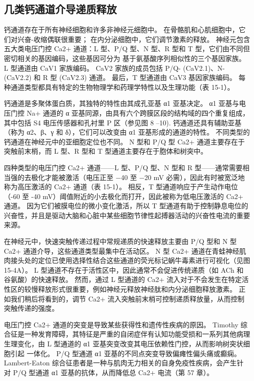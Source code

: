 \subsection{几类钙通道介导递质释放}

钙通道存在于所有神经细胞和许多非神经元细胞中。 在骨骼肌和心肌细胞中，它们对兴奋-收缩偶联很重要； 在内分泌细胞中，它们调节激素的释放。 神经元包含五大类电压门控 Ca2+ 通道：L 型、P/Q 型、N 型、R 型和 T 型，它们由不同但密切相关的基因编码，这些基因可分为 基于氨基酸序列相似性的三个基因家族。 L 型通道由 CaV1 家族编码。 CaV2 家族的成员包括 P/Q- (CaV2.1)、N- (CaV2.2) 和 R 型 (CaV2.3) 通道。 最后，T 型通道由 CaV3 基因家族编码。 每种通道类型都具有特定的生物物理学和药理学特性以及生理功能（表 15-1）。

钙通道是多聚体蛋白质，其独特的特性由其成孔亚基 α1 亚基决定。 α1 亚基与电压门控 Na+ 通道的 α 亚基同源，由具有六个跨膜区段的结构域的四个重复组成，其中包括 S4 电压传感器和孔衬里 P 区（参见图 8 –10). 钙通道还具有辅助亚基（称为 α2、β、γ 和 δ），它们可以改变由 α1 亚基形成的通道的特性。 不同类型的钙通道在神经元中的亚细胞定位也不同。 N 型和 P/Q 型 Ca2+ 通道主要存在于突触前末梢，而 L 型、R 型和 T 型通道主要存在于胞体和树突中。

四种类型的电压门控 Ca2+ 通道——L 型、P/Q 型、N 型和 R 型——通常需要相当强的去极化才能被激活（电压正至 −40 至 −20 mV 必需），因此有时被宽泛地称为高压激活的 Ca2+ 通道（表 15-1）。 相反，T 型通道响应于产生动作电位（-60 至 -40 mV）阈值附近的小去极化而打开，因此被称为低电压激活的 Ca2+ 通道。 因为它们被膜电位的微小变化激活，所以 T 型通道有助于控制静息电位的兴奋性，并且是驱动大脑和心脏中某些细胞节律性起搏器活动的兴奋性电流的重要来源。

在神经元中，快速突触传递过程中常规递质的快速释放主要由 P/Q 型和 N 型 Ca2+ 通道介导，这些通道类型最集中在活动区。 N 型 Ca2+ 通道在青蛙神经肌肉接头处的定位已使用选择性结合这些通道的荧光标记蜗牛毒素进行可视化（见图 15-4A）。 L 型通道不存在于活性区中，因此通常不会促进传统递质（如 ACh 和谷氨酸）的快速释放。 然而，通过 L 型通道的 Ca2+ 流入对于不会发生在特定活性区的较慢释放形式很重要，例如神经元释放神经肽和内分泌细胞释放激素。 正如我们稍后将看到的，调节 Ca2+ 流入突触前末梢可控制递质释放量，从而控制突触传递的强度。

电压门控 Ca2+ 通道的突变是导致某些获得性和遗传性疾病的原因。 Timothy 综合征是一种发育障碍，其特征是严重的自闭症伴有认知功能受损和一系列其他病理生理变化，由 L 型通道的 α1 亚基突变改变其电压依赖性门控，从而影响树突状细胞引起 一体化。 P/Q 型通道 α1 亚基的不同点突变导致偏瘫性偏头痛或癫痫。 Lambert-Eaton 综合征患者是一种与肌肉无力相关的自身免疫性疾病，会产生针对 P/Q 型通道 α1 亚基的抗体，从而降低总 Ca2+ 电流（第 57 章）。

